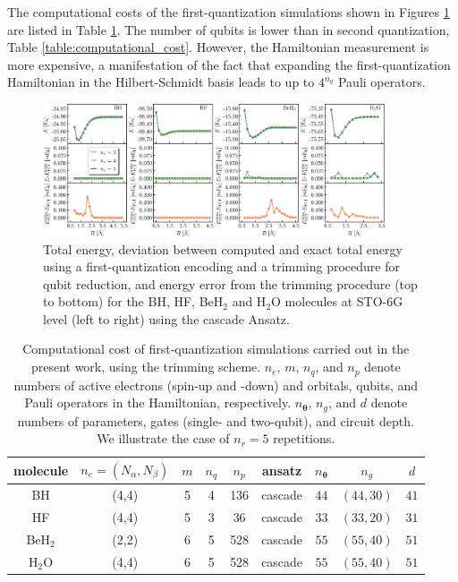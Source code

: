 \documentclass[aps,pra,onecolumn]{revtex4-2}
\newcommand{\bgreek}[1]{{\boldsymbol{#1}}}
\begin{document}
The computational costs of the first-quantization simulations shown in Figures \ref{figure:first_trim} are listed in Table \ref{table:computational_cost_first_trim}.
The number of qubits is lower than in second quantization, Table \ref{table:computational_cost}. However, the Hamiltonian measurement is more expensive,
a manifestation of the fact that expanding the first-quantization Hamiltonian in the Hilbert-Schmidt basis leads to up to $4^{n_q}$ Pauli operators.

\begin{figure}[t!]
\includegraphics[width=0.9\textwidth]{../figures/first_quantization_trim/first_quantization_trim.eps}
\caption{Total energy, deviation between computed and exact total energy using a first-quantization encoding and a trimming procedure for qubit reduction,
and energy error from the trimming procedure (top to bottom) for the BH, HF, BeH$_2$ and H$_2$O molecules at STO-6G level (left to right) 
using the cascade Ansatz.}
\label{figure:first_trim}
\end{figure} 

\begin{table}[h!]
\begin{tabular}{ccccc|cccc}
\hline\hline
molecule & $n_e=(N_\alpha,N_\beta)$ & $m$ & $n_q$ & $n_p$ & ansatz & $n_{\bgreek{\theta}}$ & $n_g$ & $d$ \\ 
\hline
BH & (4,4) & 5 & 4 & 136 & cascade & $44$ & $(44, 30)$ & $41$ \\ 
\hline
HF & (4,4) & 5 & 3 & 36 & cascade & $33$ & $(33, 20)$ & $31$ \\ 
\hline
BeH$_2$ & (2,2) & 6 & 5 & 528 & cascade & $55$ & $(55, 40)$ & $51$ \\ 
\hline
H$_2$O & (4,4) & 6 & 5 & 528 & cascade & $55$ & $(55, 40)$ & $51$ \\ 
\hline\hline
\end{tabular}
\caption{Computational cost of first-quantization simulations carried out in the present work, using the trimming scheme.
 $n_e$, $m$, $n_q$, and $n_p$ denote numbers of active electrons (spin-up and -down) and orbitals, qubits, and Pauli operators in the Hamiltonian, respectively.
$n_{\bgreek{\theta}}$, $n_g$, and $d$ denote numbers of parameters, gates (single- and two-qubit), and circuit depth. We illustrate the case of $n_r=5$ repetitions.}
\label{table:computational_cost_first_trim}
\end{table}
\end{document}
